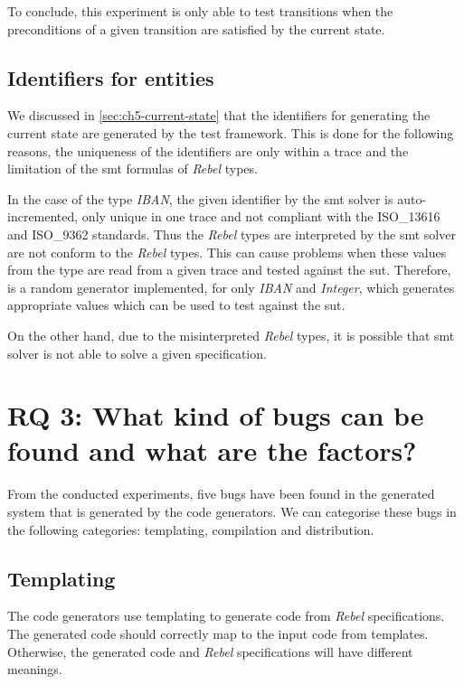 To conclude, this experiment is only able to test transitions when the preconditions of a given transition are satisfied by the current state.


\subsection{Identifiers for entities}
We discussed in \autoref{sec:ch5-current-state} that the identifiers for generating the current state are generated by the test framework. This is done for the following reasons, the uniqueness of the identifiers are only within a trace and the limitation of the \gls{smt} formulas of \textit{Rebel} types.

In the case of the type \textit{IBAN}, the given identifier by the \gls{smt} solver is auto-incremented, only unique in one trace and not compliant with the ISO\_13616 and ISO\_9362 standards. Thus the \textit{Rebel} types are interpreted by the \gls{smt} solver are not conform to the \textit{Rebel} types. This can cause problems when these values from the type are read from a given trace and tested against the \gls{sut}. Therefore, is a random generator implemented, for only \textit{IBAN} and \textit{Integer}, which generates appropriate values which can be used to test against the \gls{sut}.

On the other hand, due to the misinterpreted \textit{Rebel} types, it is possible that \gls{smt} solver is not able to solve a given specification.


\section{RQ 3: What kind of bugs can be found and what are the factors?}

From the conducted experiments, five bugs have been found in the
generated system that is generated by the code generators. We can categorise
these bugs in the following categories: templating, compilation and
distribution.

\subsection{Templating}
The code generators use templating to generate code from \textit{Rebel}
specifications. The generated code should correctly map to the input code from
templates. Otherwise, the generated code and \textit{Rebel} specifications will
have different meanings.

